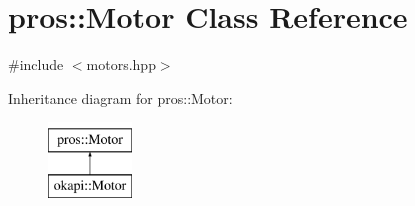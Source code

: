 \hypertarget{classpros_1_1Motor}{}\section{pros\+::Motor Class Reference}
\label{classpros_1_1Motor}


{\ttfamily \#include $<$motors.\+hpp$>$}

Inheritance diagram for pros\+::Motor\+:\begin{figure}[H]
\begin{center}
\leavevmode
\includegraphics[height=2.000000cm]{classpros_1_1Motor}
\end{center}
\end{figure}
